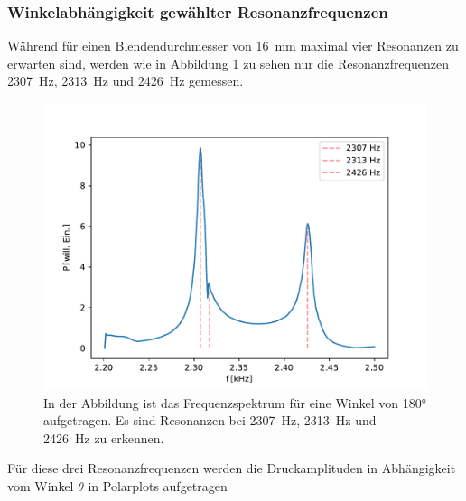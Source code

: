         \subsubsection*{Winkelabhängigkeit gewählter Resonanzfrequenzen}
            Während für einen Blendendurchmesser von \SI{16}{\milli\metre} maximal vier Resonanzen zu erwarten sind, werden wie in Abbildung \ref{fig:hmol_res} zu sehen nur die Resonanzfrequenzen 
            \SI{2307}{\hertz}, \SI{2313}{\hertz} und \SI{2426}{\hertz} gemessen.  
            \begin{figure}[ht]
                \centering
                \includegraphics[scale=0.5]{./pictures/hmol_res.pdf}
                \caption{In der Abbildung ist das Frequenzspektrum für eine Winkel von 180° aufgetragen. Es sind Resonanzen bei \SI{2307}{\hertz}, \SI{2313}{\hertz} und \SI{2426}{\hertz} zu erkennen.}
                \label{fig:hmol_res}
            \end{figure}
            \FloatBarrier
            Für diese drei Resonanzfrequenzen werden die Druckamplituden in Abhängigkeit vom Winkel $\theta$ in Polarplots aufgetragen 

